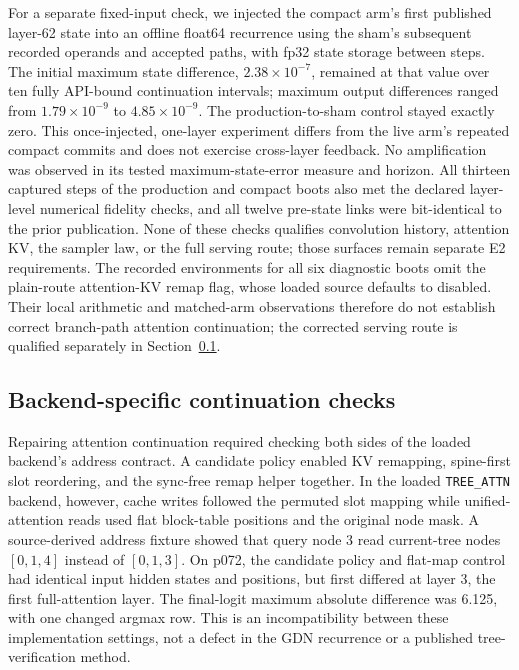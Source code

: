 \documentclass[conference]{IEEEtran}
\begin{document}
For a separate fixed-input check, we injected the compact arm's first published layer-62 state into an offline float64 recurrence using the sham's subsequent recorded operands and accepted paths, with fp32 state storage between steps. The initial maximum state difference, $2.38\times10^{-7}$, remained at that value over ten fully API-bound continuation intervals; maximum output differences ranged from $1.79\times10^{-9}$ to $4.85\times10^{-9}$. The production-to-sham control stayed exactly zero. This once-injected, one-layer experiment differs from the live arm's repeated compact commits and does not exercise cross-layer feedback. No amplification was observed in its tested maximum-state-error measure and horizon. All thirteen captured steps of the production and compact boots also met the declared layer-level numerical fidelity checks, and all twelve pre-state links were bit-identical to the prior publication. None of these checks qualifies convolution history, attention KV, the sampler law, or the full serving route; those surfaces remain separate E2 requirements. The recorded environments for all six diagnostic boots omit the plain-route attention-KV remap flag, whose loaded source defaults to disabled. Their local arithmetic and matched-arm observations therefore do not establish correct branch-path attention continuation; the corrected serving route is qualified separately in Section~\ref{sec:selected-route}.

\subsection{Backend-specific continuation checks}
\label{sec:selected-route}
Repairing attention continuation required checking both sides of the loaded backend's address contract. A candidate policy enabled KV remapping, spine-first slot reordering, and the sync-free remap helper together. In the loaded \texttt{TREE\_ATTN} backend, however, cache writes followed the permuted slot mapping while unified-attention reads used flat block-table positions and the original node mask. A source-derived address fixture showed that query node 3 read current-tree nodes $[0,1,4]$ instead of $[0,1,3]$. On p072, the candidate policy and flat-map control had identical input hidden states and positions, but first differed at layer 3, the first full-attention layer. The final-logit maximum absolute difference was 6.125, with one changed argmax row. This is an incompatibility between these implementation settings, not a defect in the GDN recurrence or a published tree-verification method.
\end{document}
